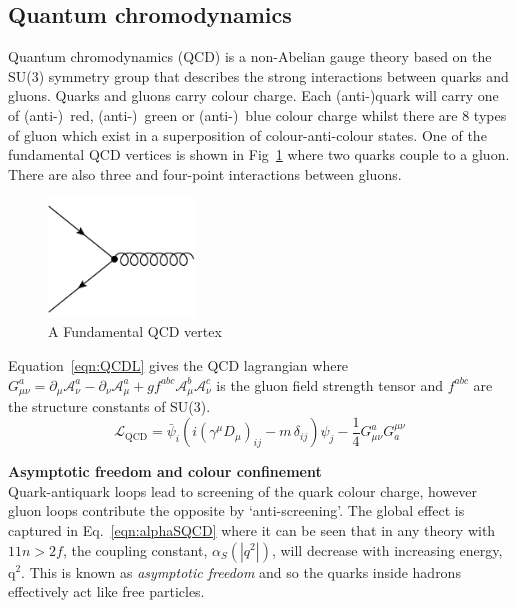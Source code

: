 \subsection{Quantum chromodynamics}

Quantum chromodynamics (QCD) is a non-Abelian gauge theory based on the SU(3) symmetry group that describes the strong interactions between quarks and gluons. Quarks and gluons carry colour charge. Each (anti-)quark will carry one of (anti-)~red, (anti-)~green or (anti-)~blue colour charge whilst there are 8 types of gluon which exist in a superposition of colour-anti-colour states. One of the fundamental QCD vertices is shown in Fig~\ref{fig:QCDvertex} where two quarks couple to a gluon. There are also three and four-point interactions between gluons.
\label{subsec:QCD}
\begin{figure}[ht!]
\begin{center}
    \includegraphics[width=0.35\textwidth]{images/Theory/QCDvertex.png}
    \caption{A Fundamental QCD vertex}
    \label{fig:QCDvertex}
\end{center}
\end{figure}


Equation~\ref{eqn:QCDL} gives the QCD lagrangian where $G_{\mu \nu }^{a}=\partial _{\mu }{\mathcal {A}}_{\nu }^{a}-\partial _{\nu }{\mathcal {A}}_{\mu }^{a}+gf^{abc}{\mathcal {A}}_{\mu }^{b}{\mathcal {A}}_{\nu }^{c}$ is the gluon field strength tensor and $f^{abc}$ are the structure constants of SU(3).
\begin{equation}
    \label{eqn:QCDL}
{\mathcal {L}}_{\mathrm {QCD} }={\bar {\psi }}_{i}\left(i(\gamma ^{\mu }D_{\mu })_{ij}-m\,\delta _{ij}\right)\psi _{j}-{\frac {1}{4}}G_{\mu \nu }^{a}G_{a}^{\mu \nu }
\end{equation}

\textbf{Asymptotic freedom and colour confinement}\\
Quark-antiquark loops lead to screening of the quark colour charge, however gluon loops contribute the opposite by `anti-screening'. The global effect is captured in Eq.~\ref{eqn:alphaSQCD} where it can be seen that in any theory with $11n>2f$, the coupling constant, $\alpha_{S}\left( |q^{2}| \right)$, will decrease with increasing energy, q$^{2}$. This is known as \emph{asymptotic freedom} and so the quarks inside hadrons effectively act like free particles.

